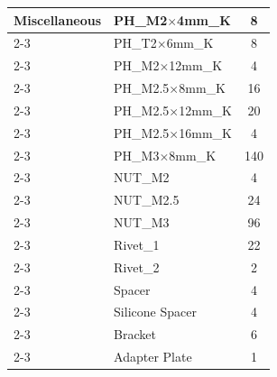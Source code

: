 \begin{table}[htbp]
\begin{tabular}{|m{3.5cm}|l|c|}
	\hline
	Miscellaneous & PH\_M2$\times$4mm\_K & 8 \\
	\cline{2-3} & PH\_T2$\times$6mm\_K & 8 \\
	\cline{2-3} & PH\_M2$\times$12mm\_K & 4 \\
	\cline{2-3} & PH\_M2.5$\times$8mm\_K & 16 \\
	\cline{2-3} & PH\_M2.5$\times$12mm\_K & 20 \\
	\cline{2-3} & PH\_M2.5$\times$16mm\_K & 4 \\
	\cline{2-3} & PH\_M3$\times$8mm\_K & 140 \\
	\cline{2-3} & NUT\_M2 & 4 \\
	\cline{2-3} & NUT\_M2.5 & 24 \\
	\cline{2-3} & NUT\_M3 & 96 \\
	\cline{2-3} & Rivet\_1 & 22 \\
	\cline{2-3} & Rivet\_2 & 2 \\
	\cline{2-3} & Spacer & 4 \\
	\cline{2-3} & Silicone Spacer & 4 \\
	\cline{2-3} & Bracket & 6 \\
	\cline{2-3} & Adapter Plate & 1 \\
	\hline
	\end{tabular}
\end{table}

